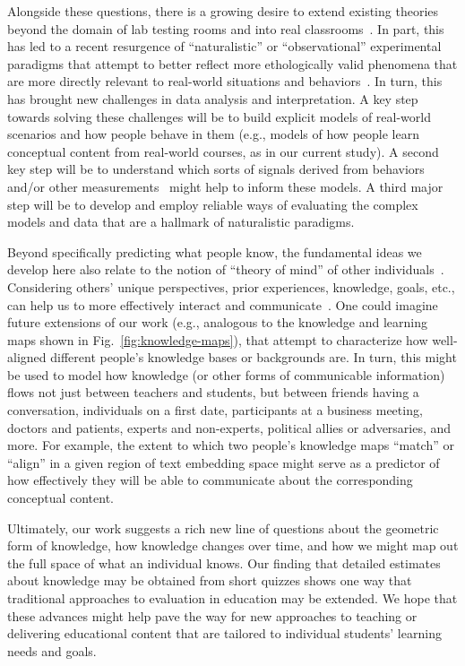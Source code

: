 \documentclass[10pt]{article}
\begin{document}
Alongside these questions, there is a growing desire to extend existing
theories beyond the domain of lab testing rooms and into real
classrooms~\citep{Kauf03}. In part, this has led to a recent resurgence of
``naturalistic'' or ``observational'' experimental paradigms that attempt to
better reflect more ethologically valid phenomena that are more directly
relevant to real-world situations and behaviors~\citep{NastEtal20}. In turn,
this has brought new challenges in data analysis and interpretation. A key step
towards solving these challenges will be to build explicit models of real-world
scenarios and how people behave in them (e.g., models of how people learn
conceptual content from real-world courses, as in our current study). A second
key step will be to understand which sorts of signals derived from behaviors
and/or other measurements~\citep[e.g., neurophysiological data; ][]{NguyEtal22,
MeshEtal20, PoulEtal17, BeviEtal19, DikkEtal17} might help to inform these
models. A third major step will be to develop and employ reliable ways of
evaluating the complex models and data that are a hallmark of naturalistic
paradigms.

Beyond specifically predicting what people know, the fundamental ideas
we develop here also relate to the notion of ``theory of mind'' of other
individuals~\citep{GoldWinn12, KansEtal15, Melt11}. Considering others' unique
perspectives, prior experiences, knowledge, goals, etc., can help us to more
effectively interact and communicate~\citep{ShaoEtal18, StepBaer06, Ratk18}.
One could imagine future extensions of our work (e.g., analogous to the
knowledge and learning maps shown in Fig.~\ref{fig:knowledge-maps}), that
attempt to characterize how well-aligned different people's knowledge bases or
backgrounds are. In turn, this might be used to model how knowledge (or other
forms of communicable information) flows not just between teachers and
students, but between friends having a conversation, individuals on a first
date, participants at a business meeting, doctors and patients, experts and
non-experts, political allies or adversaries, and more. For example, the extent
to which two people's knowledge maps ``match'' or ``align'' in a given region
of text embedding space might serve as a predictor of how effectively they will
be able to communicate about the corresponding conceptual content.

Ultimately, our work suggests a rich new line of questions about the geometric
form of knowledge, how knowledge changes over time, and how we might map
out the full space of what an individual knows. Our finding that detailed
estimates about knowledge may be obtained from short quizzes shows one way that
traditional approaches to evaluation in education may be extended. We hope that
these advances might help pave the way for new approaches to teaching or
delivering educational content that are tailored to individual students'
learning needs and goals.
\end{document}
